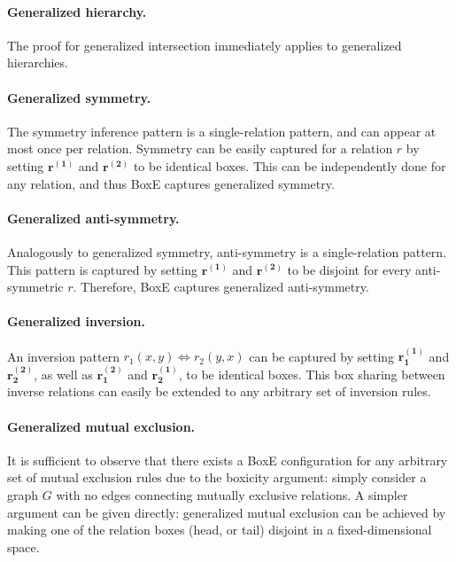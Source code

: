 \documentclass{article}
\begin{document}
\paragraph{Generalized hierarchy.} The proof for generalized intersection immediately applies to generalized hierarchies. 

\paragraph{Generalized symmetry.} The symmetry inference pattern is a single-relation pattern, and can appear at most once per relation. Symmetry can be easily captured for a relation $r$ by setting $\bm{r^{(1)}}$ and $\bm{r^{(2)}}$ to be identical boxes. This can be independently done for any relation, and thus BoxE captures generalized symmetry. 

\paragraph{Generalized anti-symmetry.} Analogously to generalized symmetry, anti-symmetry is a single-relation pattern. This pattern is captured by setting $\bm{r^{(1)}}$ and $\bm{r^{(2)}}$ to be disjoint for every anti-symmetric $r$. Therefore, BoxE captures generalized anti-symmetry.

\paragraph{Generalized inversion.} An inversion pattern $r_1(x,y) \Leftrightarrow r_2(y,x)$ can be captured by setting $\bm{r_1^{(1)}}$ and $\bm{r_2^{(2)}}$, as well as $\bm{r_1^{(2)}}$ and $\bm{r_2^{(1)}}$, to be identical boxes. This box sharing between inverse relations can easily be extended to any arbitrary set of inversion rules. 

\paragraph{Generalized mutual exclusion.} It is sufficient to observe that there exists a BoxE configuration for any arbitrary set of mutual exclusion rules due to the boxicity argument: simply consider a graph $G$ with no edges connecting mutually exclusive relations. A simpler argument can be given directly: generalized mutual exclusion can be achieved by making one of the relation boxes (head, or tail) disjoint in a fixed-dimensional space. 
\end{document}
